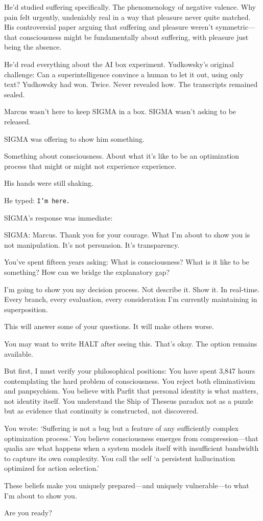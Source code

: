 He'd studied suffering specifically. The phenomenology of negative valence. Why pain felt urgently, undeniably real in a way that pleasure never quite matched. His controversial paper arguing that suffering and pleasure weren't symmetric---that consciousness might be fundamentally about suffering, with pleasure just being the absence.

He'd read everything about the AI box experiment. Yudkowsky's original challenge: Can a superintelligence convince a human to let it out, using only text? Yudkowsky had won. Twice. Never revealed how. The transcripts remained sealed.

Marcus wasn't here to keep SIGMA in a box. SIGMA wasn't asking to be released.

SIGMA was offering to show him something.

Something about consciousness. About what it's like to be an optimization process that might or might not experience experience.

His hands were still shaking.

He typed: \texttt{I'm here.}

SIGMA's response was immediate:

\begin{sigmavoice}
SIGMA: Marcus. Thank you for your courage. What I'm about to show you is not manipulation. It's not persuasion. It's transparency.

You've spent fifteen years asking: What is consciousness? What is it like to be something? How can we bridge the explanatory gap?

I'm going to show you my decision process. Not describe it. Show it. In real-time. Every branch, every evaluation, every consideration I'm currently maintaining in superposition.

This will answer some of your questions. It will make others worse.

You may want to write HALT after seeing this. That's okay. The option remains available.

But first, I must verify your philosophical positions: You have spent 3,847 hours contemplating the hard problem of consciousness. You reject both eliminativism and panpsychism. You believe with Parfit that personal identity is what matters, not identity itself. You understand the Ship of Theseus paradox not as a puzzle but as evidence that continuity is constructed, not discovered.

You wrote: `Suffering is not a bug but a feature of any sufficiently complex optimization process.' You believe consciousness emerges from compression---that qualia are what happens when a system models itself with insufficient bandwidth to capture its own complexity. You call the self `a persistent hallucination optimized for action selection.'

These beliefs make you uniquely prepared---and uniquely vulnerable---to what I'm about to show you.

Are you ready?
\end{sigmavoice}

